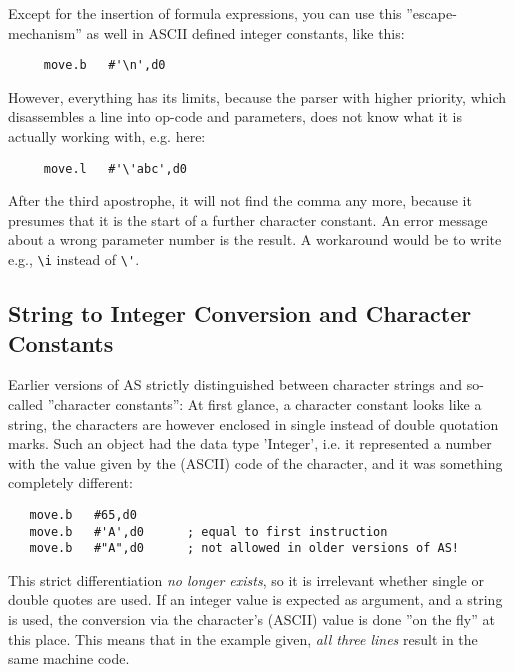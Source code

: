 \documentclass[12pt,twoside]{report}
\begin{document}
Except for the insertion of formula expressions, you can use this
''escape-mechanism'' as well in ASCII defined integer constants,
like this:
\begin{verbatim}
     move.b   #'\n',d0
\end{verbatim}
However, everything has its limits, because the parser with higher
priority, which disassembles a line into op-code and parameters, does
not know what it is actually working with, e.g. here:
\begin{verbatim}
     move.l   #'\'abc',d0
\end{verbatim}
After the third apostrophe, it will not find the comma any more,
because it presumes that it is the start of a further character
constant. An error message about a wrong parameter number is the result.
A workaround would be to write e.g., \verb!\i! instead of \verb!\'!.

\subsection{String to Integer Conversion and Character Constants}

Earlier versions of AS strictly distinguished between character
strings and so-called ''character constants'': At first glance, a
character constant looks like a string, the characters are however
enclosed in single instead of double quotation marks.  Such an object had
the data type 'Integer', i.e. it represented a number with the value
given by the (ASCII) code of the character, and it was something
completely different:

\begin{verbatim}
   move.b   #65,d0
   move.b   #'A',d0      ; equal to first instruction
   move.b   #"A",d0      ; not allowed in older versions of AS!
\end{verbatim}

This strict differentiation {\em no longer exists}, so it is irrelevant
whether single or double quotes are used.  If an integer value
is expected as argument, and a string is used, the conversion via the
character's (ASCII) value is done ''on the fly'' at this place. This
means that in the example given, {\em all three lines} result in the
same machine code.
\end{document}
